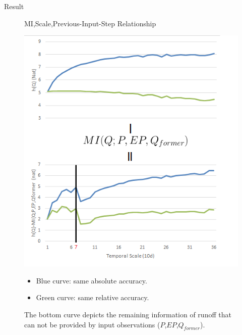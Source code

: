 \documentclass[final]{beamer}
\newlength{\onecolwid}
\begin{document}
\begin{frame}[t]
\begin{columns}[t]
\begin{column}{\onecolwid}
\begin{block}{Result}
\begin{figure}[H]
MI,Scale,Previous-Input-Step Relationship
\vspace{39pt}
\end{figure} 

\vspace{12pt}


 \begin{figure}


\begin{minipage}{.48\linewidth}
  \centerline{\includegraphics[width=13.6cm]{entropy_aligned.png}}

\end{minipage}
\hfill
\begin{minipage}{0.50\linewidth}
\begin{itemize}
\item Blue curve: same absolute accuracy.
\item Green curve: same relative accuracy.
\end{itemize}
The bottom curve depicts the remaining information
of runoff that can not be provided by input observations ($P$,$EP$,$Q_{former}$).
\end{minipage}
\end{figure}



\end{block}
\end{column}
\end{columns}
\end{frame}
\end{document}
